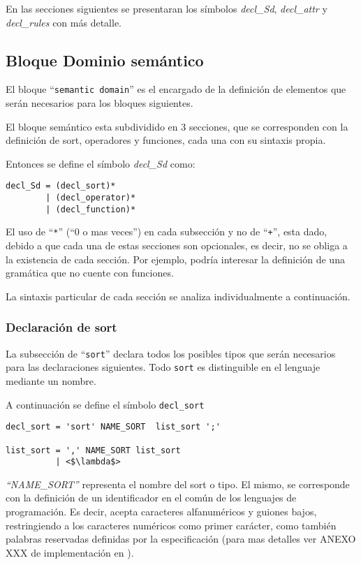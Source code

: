 En las secciones siguientes se presentaran los símbolos \textit{decl\_Sd}, \textit{decl\_attr} y \textit{decl\_rules} con más detalle.  

\subsection{Bloque Dominio semántico}

El bloque ``\texttt{semantic domain}'' es el encargado de la definición de elementos que serán necesarios para los bloques siguientes. 

El bloque semántico esta subdividido en 3 secciones, que se corresponden con la definición de sort, operadores y funciones, cada una con su sintaxis propia. 

Entonces se define el símbolo \textit{decl\_Sd} como:

\begin{lstlisting}[frame=shadowbox, rulesepcolor=\color{blue},language=inform,linewidth=10cm]
decl_Sd = (decl_sort)*
        | (decl_operator)*
        | (decl_function)*
\end{lstlisting}

El uso de ``\texttt{*}'' (``0 o mas veces'') en cada subsección y no de ``\texttt{+}'', esta dado, debido a que cada una de estas secciones son opcionales, es decir, no se obliga a la existencia de cada sección. Por ejemplo, podría interesar la definición de una gramática que no cuente con funciones.

La sintaxis particular de cada sección se analiza individualmente a continuación.

\subsubsection{Declaración de sort}
La subsección de ``\texttt{sort}'' declara todos los posibles tipos que serán necesarios para las declaraciones siguientes. Todo \texttt{sort} es distinguible en el lenguaje mediante un nombre.

A continuación se define el símbolo \texttt{decl\_sort}

\begin{lstlisting}[escapeinside=<>, frame=shadowbox, rulesepcolor=\color{blue},language=inform, linewidth=10cm]
decl_sort = 'sort' NAME_SORT  list_sort ';'

list_sort = ',' NAME_SORT list_sort
          | <$\lambda$> 
\end{lstlisting}

\textit{``NAME\_SORT''} representa el nombre del sort o tipo. El mismo, se corresponde con la definición de un identificador en el común de los lenguajes de programación. Es decir, acepta caracteres alfanuméricos y guiones bajos, restringiendo a los caracteres numéricos como primer carácter, como también palabras reservadas definidas por la especificación (para mas detalles ver ANEXO  XXX de implementación en \spirit).\\


